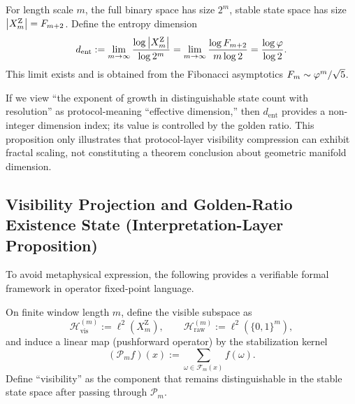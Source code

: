 \begin{definition}\label{def:entropy-dimension}
For length scale $m$, the full binary space has size $2^m$, stable state space has size $\left\lvert X_m^{\mathrm Z}\right\rvert=F_{m+2}$. Define the entropy dimension
\[
d_{\mathrm{ent}}:=\lim_{m\to\infty}\frac{\log \left\lvert X_m^{\mathrm Z}\right\rvert}{\log 2^m}
=\lim_{m\to\infty}\frac{\log F_{m+2}}{m\log 2}
=\frac{\log\varphi}{\log 2}.
\]
This limit exists and is obtained from the Fibonacci asymptotics $F_{m}\sim \varphi^m/\sqrt{5}$.
\end{definition}

\begin{remark}
If we view ``the exponent of growth in distinguishable state count with resolution'' as protocol-meaning ``effective dimension,'' then $d_{\mathrm{ent}}$ provides a non-integer dimension index; its value is controlled by the golden ratio. This proposition only illustrates that protocol-layer visibility compression can exhibit fractal scaling, not constituting a theorem conclusion about geometric manifold dimension.
\end{remark}

\subsection{Visibility Projection and Golden-Ratio Existence State (Interpretation-Layer Proposition)}

To avoid metaphysical expression, the following provides a verifiable formal framework in operator fixed-point language.

\begin{definition}\label{def:visibility-projection}
On finite window length $m$, define the visible subspace as
\[
\mathcal{H}^{(m)}_{\mathrm{vis}}:=\ell^2(X_m^{\mathrm Z}),\qquad
\mathcal{H}^{(m)}_{\mathrm{raw}}:=\ell^2(\{0,1\}^m),
\]
and induce a linear map (pushforward operator) by the stabilization kernel
\[
(\mathcal{P}_m f)(x):=\sum_{\omega\in \mathcal{F}_m(x)} f(\omega).
\]
Define ``visibility'' as the component that remains distinguishable in the stable state space after passing through $\mathcal{P}_m$.
\end{definition}

